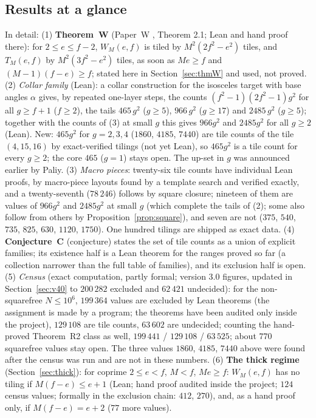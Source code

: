 \documentclass[11pt,reqno]{amsart}
\theoremstyle{plain}
\theoremstyle{definition}
\begin{document}
\subsection{Results at a glance}
In detail:
(1) \textbf{Theorem~W} (Paper~W \cite{PaperW}, Theorem 2.1; Lean and hand proof there): for $2\le e\le f-2$, $W_M(e,f)$ is tiled by $M^2(2f^2-e^2)$ tiles, and $T_M(e,f)$ by $M^2(3f^2-e^2)$ tiles, as soon as $Me\ge f$ and $(M-1)(f-e)\ge f$; stated here in Section~\ref{sec:thmW} and used, not proved.
(2) \emph{Collar family} (Lean): a collar construction for the isosceles target with base angles $\alpha$ gives, by repeated one-layer steps, the counts $(f^2-1)(2f^2-1)g^2$ for all $g\ge f+1$ ($f\ge2$), the tails $465\,g^2$ ($g\ge5$), $966\,g^2$ ($g\ge17$) and $2485\,g^2$ ($g\ge5$); together with the counts of (3) at small $g$ this gives $966g^2$ and $2485g^2$ for all $g\ge2$ (Lean). New: $465g^2$ for $g=2,3,4$ ($1860$, $4185$, $7440$) are tile counts of the tile $(4,15,16)$ by exact-verified tilings (not yet Lean), so $465g^2$ is a tile count for every $g\ge2$; the core $465$ ($g=1$) stays open. The up-set in $g$ was announced earlier by Paliy.
(3) \emph{Macro pieces}: twenty-six tile counts have individual Lean proofs, by macro-piece layouts found by a template search and verified exactly, and a twenty-seventh ($78\,246$) follows by square closure; nineteen of them are values of $966g^2$ and $2485g^2$ at small $g$ (which complete the tails of (2); some also follow from others by Proposition~\ref{prop:square}), and seven are not ($375$, $540$, $735$, $825$, $630$, $1120$, $1750$). One hundred tilings are shipped as exact data.
(4) \textbf{Conjecture~C} (conjecture) states the set of tile counts as a union of explicit families; its existence half is a Lean theorem for the ranges proved so far (a collection narrower than the full table of families), and its exclusion half is open.
(5) \emph{Census} (exact computation, partly formal; version 3.0 figures, updated in Section~\ref{sec:v40} to $200\,282$ excluded and $62\,421$ undecided): for the non-squarefree $N\le10^6$, $199\,364$ values are excluded by Lean theorems (the assignment is made by a program; the theorems have been audited only inside the project), $129\,108$ are tile counts, $63\,602$ are undecided; counting the hand-proved Theorem~R2 class as well, $199\,441$ / $129\,108$ / $63\,525$; about $770$ squarefree values stay open. The three values $1860$, $4185$, $7440$ above were found after the census was run and are not in these numbers.
(6) \textbf{The thick regime} (Section~\ref{sec:thick}): for coprime $2\le e<f$, $M<f$, $Me\ge f$: $W_M(e,f)$ has no tiling if $M(f-e)\le e+1$ (Lean; hand proof audited inside the project; $124$ census values; formally in the exclusion chain: $412$, $270$), and, as a hand proof only, if $M(f-e)=e+2$ ($77$ more values).
\end{document}

